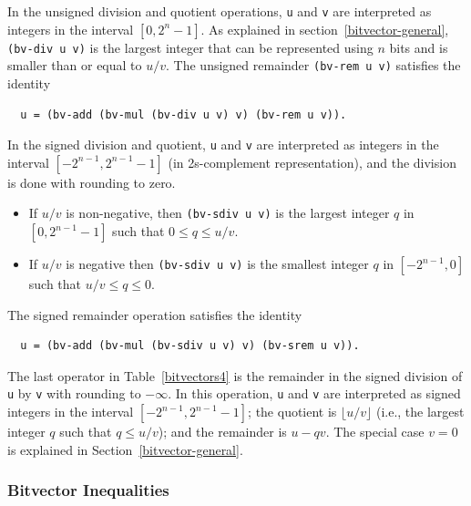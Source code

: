 \documentclass[11pt,twoside,fleqn,openright,titlepage]{cslreport}
\begin{document}
\medskip\noindent
In the unsigned division and quotient operations, \texttt{u} and
\texttt{v} are interpreted as integers in the interval $[0,2^n-1]$.
As explained in section~\ref{bitvector-general}, \texttt{(bv-div u v)}
is the largest integer that can be represented using $n$ bits and is
smaller than or equal to $u/v$. The unsigned remainder
\texttt{(bv-rem u v)} satisfies the identity
\begin{small}
\begin{verbatim}
  u = (bv-add (bv-mul (bv-div u v) v) (bv-rem u v)).
\end{verbatim}
\end{small}
In the signed division and quotient, \texttt{u} and \texttt{v} are
interpreted as integers in the interval $[-2^{n-1},2^{n-1}-1]$ (in
2s-complement representation), and the division is done with rounding
to zero.
\begin{itemize}
\item If $u/v$ is non-negative, then \texttt{(bv-sdiv u v)}
is the largest integer $q$ in $[0,2^{n-1}-1]$ such that $0 \leq q \leq
u/v$.
\item If $u/v$ is negative then \texttt{(bv-sdiv u v)}
is the smallest integer $q$ in $[-2^{n-1}, 0]$ such that $u/v
\leq q \leq 0$.
\end{itemize}
The signed remainder operation satisfies the identity
\begin{small}
\begin{verbatim}
  u = (bv-add (bv-mul (bv-sdiv u v) v) (bv-srem u v)).
\end{verbatim}
\end{small}
The last operator in Table~\ref{bitvectors4} is the remainder in the
signed division of \texttt{u} by \texttt{v} with rounding to
$-\infty$.  In this operation, \texttt{u} and \texttt{v} are
interpreted as signed integers in the interval $[-2^{n-1},2^{n-1}-1]$;
the quotient is $\lfloor u/v \rfloor$ (i.e., the largest
integer $q$ such that $q \leq u/v$); and the remainder is $u -
q v$. The special case $v=0$ is explained in
Section~\ref{bitvector-general}.

\subsubsection*{Bitvector Inequalities}
\end{document}
